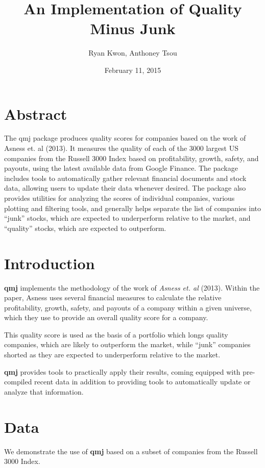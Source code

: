 \documentclass[titlepage]{article}
\author{Ryan Kwon, Anthoney Tsou}
\title{An Implementation of Quality Minus Junk}
\date{February 11, 2015}
\begin{document}

\maketitle

\section{Abstract}
The qmj package produces quality scores for companies based on the work of Asness et. al (2013). It measures the quality of each of the 3000 largest US companies from the Russell 3000 Index based on profitability, growth, safety, and payouts, using the latest available data from Google Finance. The package includes tools to automatically gather relevant financial documents and stock data, allowing users to update their data whenever desired. The package also provides utilities for analyzing the scores of individual companies, various plotting and filtering tools, and generally helps separate the list of companies into ``junk'' stocks, which are expected to underperform relative to the market, and ``quality'' stocks, which are expected to outperform. 

\section*{Introduction}
\textbf{qmj} implements the methodology of the work of \emph{Asness et. al} (2013). Within the paper, Asness uses several financial measures to calculate the relative profitability, growth, safety, and payouts of a company within a given universe, which they use to provide an overall quality score for a company.

This quality score is used as the basis of a portfolio which longs quality companies, which are likely to outperform the market, while ``junk'' companies shorted as they are expected to underperform relative to the market.

\textbf{qmj} provides tools to practically apply their results, coming equipped with pre-compiled recent data in addition to providing tools to automatically update or analyze that information.

\section*{Data}
We demonstrate the use of \textbf{qmj} based on a subset of companies from the Russell 3000 Index. 
\end{document}

